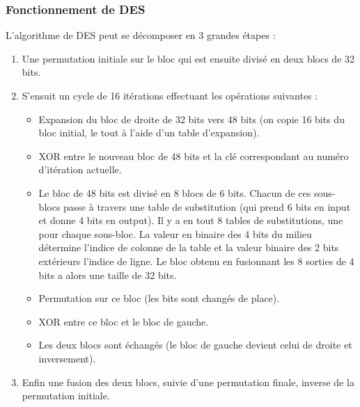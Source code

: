 \documentclass[a4paper,12pt]{article}
\begin{document}
\clearpage

\subsubsection{Fonctionnement de DES}	

L'algorithme de DES peut se décomposer en 3 grandes étapes :

\begin{enumerate}
\item Une permutation initiale sur le bloc qui est ensuite divisé en deux blocs de 32 bits.

\item S'ensuit un cycle de 16 itérations effectuant les opérations suivantes :
\begin{itemize}
\item Expansion du bloc de droite de 32 bits vers 48 bits (on copie 16 bits du bloc initial, le tout à l'aide d'un table d'expansion). 
\item XOR entre le nouveau bloc de 48 bits et la clé correspondant au numéro d'itération actuelle.
\item Le bloc de 48 bits est divisé en 8 blocs de 6 bits. Chacun de ces sous-blocs passe à travers une table de substitution (qui prend 6 bits en input et donne 4 bits en output). Il y a en tout 8 tables de substitutions, une pour chaque sous-bloc. La valeur en binaire des 4 bits du milieu détermine l'indice de colonne de la table et la valeur binaire des 2 bits extérieurs l'indice de ligne. Le bloc obtenu en fusionnant les 8 sorties de 4 bits a alors une taille de 32 bits.
\item Permutation sur ce bloc (les bits sont changés de place).
\item XOR entre ce bloc et le bloc de gauche.
\item Les deux blocs sont échangés (le bloc de gauche devient celui de droite et inversement).
\end{itemize}

\item Enfin une fusion des deux blocs, suivie d'une permutation finale, inverse de la permutation initiale.
\end{enumerate}
\end{document}
